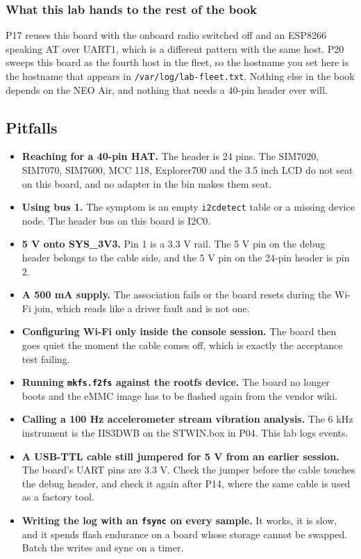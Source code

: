 \subsubsection*{What this lab hands to the rest of the book}

P17 reuses this board with the onboard radio switched off and an ESP8266 speaking AT over UART1, which is a different pattern with the same host. P20 sweeps this board as the fourth host in the fleet, so the hostname you set here is the hostname that appears in \texttt{/var/log/lab-fleet.txt}. Nothing else in the book depends on the NEO Air, and nothing that needs a 40-pin header ever will.

\subsection*{Pitfalls}

\begin{itemize}
\item \textbf{Reaching for a 40-pin HAT.} The header is 24 pins. The SIM7020, SIM7070, SIM7600, MCC 118, Explorer700 and the 3.5 inch LCD do not seat on this board, and no adapter in the bin makes them seat.
\item \textbf{Using bus 1.} The symptom is an empty \texttt{i2cdetect} table or a missing device node. The header bus on this board is I2C0.
\item \textbf{5 V onto SYS\_3V3.} Pin 1 is a 3.3 V rail. The 5 V pin on the debug header belongs to the cable side, and the 5 V pin on the 24-pin header is pin 2.
\item \textbf{A 500 mA supply.} The association fails or the board resets during the Wi-Fi join, which reads like a driver fault and is not one.
\item \textbf{Configuring Wi-Fi only inside the console session.} The board then goes quiet the moment the cable comes off, which is exactly the acceptance test failing.
\item \textbf{Running \texttt{mkfs.f2fs} against the rootfs device.} The board no longer boots and the eMMC image has to be flashed again from the vendor wiki.
\item \textbf{Calling a 100 Hz accelerometer stream vibration analysis.} The 6 kHz instrument is the IIS3DWB on the STWIN.box in P04. This lab logs events.
\item \textbf{A USB-TTL cable still jumpered for 5 V from an earlier session.} The board's UART pins are 3.3 V. Check the jumper before the cable touches the debug header, and check it again after P14, where the same cable is used as a factory tool.
\item \textbf{Writing the log with an \texttt{fsync} on every sample.} It works, it is slow, and it spends flash endurance on a board whose storage cannot be swapped. Batch the writes and sync on a timer.
\end{itemize}

